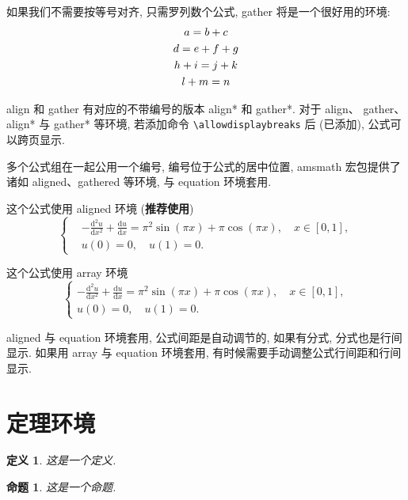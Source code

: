 \documentclass[a4paper,12pt]{article}
\theoremstyle{plain}
\newtheorem{definition}{定义}[section]
\newtheorem{proposition}{命题}[section]
\begin{document}
如果我们不需要按等号对齐, 只需罗列数个公式, gather 将是一个很好用的环境:
\begin{gather}
a = b + c \\
d = e + f + g \\
h + i = j + k \notag \\
l + m = n
\end{gather}

align 和 gather 有对应的不带编号的版本 align* 和 gather*.
对于 align、 gather、align* 与 gather* 等环境, 若添加命令 \verb|\allowdisplaybreaks| 后 (已添加), 公式可以跨页显示.

多个公式组在一起公用一个编号, 编号位于公式的居中位置, amsmath 宏包提供了诸如 aligned、gathered 等环境, 与 equation 环境套用.

这个公式使用 aligned 环境 (\textbf{推荐使用})
\begin{equation}\label{eqn:1}
\left\{\begin{aligned}
  &-\frac{\mathrm{d}^{2} u}{\mathrm{d} x^{2}}+\frac{\mathrm{d} u}{\mathrm{d} x}=\pi^{2} \sin (\pi x)+\pi \cos (\pi x),\quad x \in [0,1], \\
  &u(0)=0,\quad u(1)=0.
\end{aligned} \right.
\end{equation}

这个公式使用 array 环境
\begin{equation}\label{eqn:2}
\left\{\begin{array}{l}
\displaystyle
-\frac{\mathrm{d}^{2} u}{\mathrm{d} x^{2}}+\frac{\mathrm{d} u}{\mathrm{d} x}=\pi^{2} \sin (\pi x)+\pi \cos (\pi x),\quad x \in [0,1], \\[6pt]
u(0)=0,\quad u(1)=0.
\end{array} \right.
\end{equation}

aligned 与 equation 环境套用, 公式间距是自动调节的, 如果有分式, 分式也是行间显示. 如果用 array 与 equation 环境套用, 有时候需要手动调整公式行间距和行间显示.



\section{定理环境}

\begin{definition}
这是一个定义.
\end{definition}

\begin{proposition}
这是一个命题.
\end{proposition}
\end{document}
